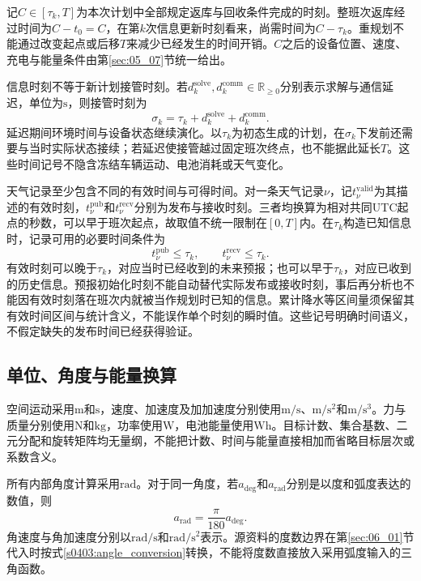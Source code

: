 记$C\in[\tau_k,T]$为本次计划中全部规定返库与回收条件完成的时刻。整班次返库经过时间为$C-t_0=C$，在第$k$次信息更新时刻看来，尚需时间为$C-\tau_k$。重规划不能通过改变起点或后移$T$来减少已经发生的时间开销。$C$之后的设备位置、速度、充电与能量条件由第\ref{sec:05_07}节统一给出。

信息时刻不等于新计划接管时刻。若$d_k^{\mathrm{solve}},d_k^{\mathrm{comm}}\in\mathbb R_{\ge0}$分别表示求解与通信延迟，单位为$\mathrm s$，则接管时刻为
\begin{equation}
 \sigma_k=\tau_k+d_k^{\mathrm{solve}}+d_k^{\mathrm{comm}}.
 \label{s0403:takeover_clock}
\end{equation}
延迟期间环境时间与设备状态继续演化。以$\tau_k$为初态生成的计划，在$\sigma_k$下发前还需要与当时实际状态接续；若延迟使接管越过固定班次终点，也不能据此延长$T$。这些时间记号不隐含冻结车辆运动、电池消耗或天气变化。

天气记录至少包含不同的有效时间与可得时间。对一条天气记录$\nu$，记$t_\nu^{\mathrm{valid}}$为其描述的有效时刻，$t_\nu^{\mathrm{pub}}$和$t_\nu^{\mathrm{recv}}$分别为发布与接收时刻。三者均换算为相对共同UTC起点的秒数，可以早于班次起点，故取值不统一限制在$[0,T]$内。在$\tau_k$构造已知信息时，记录可用的必要时间条件为
\begin{equation}
 t_\nu^{\mathrm{pub}}\le\tau_k,
 \qquad t_\nu^{\mathrm{recv}}\le\tau_k.
 \label{s0403:weather_availability}
\end{equation}
有效时刻可以晚于$\tau_k$，对应当时已经收到的未来预报；也可以早于$\tau_k$，对应已收到的历史信息。预报初始化时刻不能自动替代实际发布或接收时刻，事后再分析也不能因有效时刻落在班次内就被当作规划时已知的信息。累计降水等区间量须保留其有效时间区间与统计含义，不能误作单个时刻的瞬时值。这些记号明确时间语义，不假定缺失的发布时间已经获得验证。

\subsection{单位、角度与能量换算}

空间运动采用$\mathrm m$和$\mathrm s$，速度、加速度及加加速度分别使用$\mathrm{m/s}$、$\mathrm{m/s^2}$和$\mathrm{m/s^3}$。力与质量分别使用$\mathrm N$和$\mathrm{kg}$，功率使用$\mathrm W$，电池能量使用$\mathrm{Wh}$。目标计数、集合基数、二元分配和旋转矩阵均无量纲，不能把计数、时间与能量直接相加而省略目标层次或系数含义。

所有内部角度计算采用$\mathrm{rad}$。对于同一角度，若$a_{\mathrm{deg}}$和$a_{\mathrm{rad}}$分别是以度和弧度表达的数值，则
\begin{equation}
 a_{\mathrm{rad}}=\frac{\pi}{180}a_{\mathrm{deg}}.
 \label{s0403:angle_conversion}
\end{equation}
角速度与角加速度分别以$\mathrm{rad/s}$和$\mathrm{rad/s^2}$表示。源资料的度数边界在第\ref{sec:06_01}节代入时按式\eqref{s0403:angle_conversion}转换，不能将度数直接放入采用弧度输入的三角函数。

